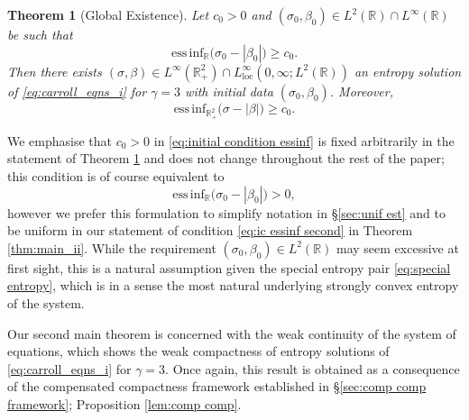 \documentclass[11pt,a4paper,reqno]{amsart}
\numberwithin{equation}{section}
\newtheorem{theorem}{Theorem}[section]
\theoremstyle{definition}
\theoremstyle{remark}
\newcommand{\essinf}{\mathrm{ess \, inf}}
\newcommand{\loc}{\mathrm{loc}}
\renewcommand{\geq}{\geqslant}
\begin{document}
{\begin{theorem}[Global Existence]\label{thm:main_i}
        Let $c_0>0$ and $(\sigma_0,\beta_0) \in L^2(\mathbb{R}) \cap L^\infty(\mathbb{R})$ be such that 
        \begin{equation}\label{eq:initial condition essinf}
           \essinf_\mathbb{R} \big( \sigma_0 - |\beta_0| \big) \geq c_0. 
        \end{equation}
        Then there exists $(\sigma,\beta) \in L^\infty(\mathbb{R}^2_+) \cap L^\infty_{\loc}(0,\infty;L^2(\mathbb{R}))$ an entropy solution of \eqref{eq:carroll_eqns_i} for $\gamma=3$ with initial data $(\sigma_0,\beta_0)$. Moreover, 
         \begin{equation*}
           \essinf_{\mathbb{R}^2_+} \big( \sigma - |\beta| \big) \geq c_0. 
        \end{equation*}
\end{theorem}

We emphasise that $c_0>0$ in \eqref{eq:initial condition essinf} is fixed arbitrarily in the statement of Theorem \ref{thm:main_i} and does not change throughout the rest of the paper; this condition is of course equivalent to 
\begin{equation*}
    \essinf_\mathbb{R} \big( \sigma_0 - |\beta_0| \big) > 0, 
\end{equation*}
however we prefer this formulation to simplify notation in \S \ref{sec:unif est} and to be uniform in our statement of condition \eqref{eq:ic essinf second} in Theorem \ref{thm:main_ii}. While the requirement $(\sigma_0,\beta_0) \in L^2(\mathbb{R})$ may seem excessive at first sight, this is a natural assumption given the special entropy pair \eqref{eq:special entropy}, which is in a sense the most natural underlying strongly convex entropy of the system. 


Our second main theorem is concerned with the weak continuity of the system of equations, which shows the weak compactness of entropy solutions of \eqref{eq:carroll_eqns_i} for $\gamma=3$. Once again, this result is obtained as a consequence of the compensated compactness framework established in \S \ref{sec:comp comp framework}; Proposition \ref{lem:comp comp}.

}
\end{document}
